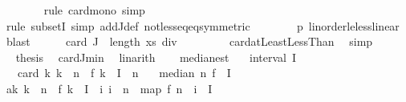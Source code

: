 \begin{isabellebody}
\ \ \ \ \ \ \isamarkupfalse%
\ {\isacharparenleft}{\kern0pt}rule\ card{\isacharunderscore}{\kern0pt}mono{\isacharcomma}{\kern0pt}\ simp{\isacharparenright}{\kern0pt}\isanewline
\ \ \ \ \ \ \isamarkupfalse%
\ {\isacharparenleft}{\kern0pt}rule\ subsetI{\isacharcomma}{\kern0pt}\ simp\ add{\isacharcolon}{\kern0pt}J{\isacharunderscore}{\kern0pt}def\ not{\isacharunderscore}{\kern0pt}less{\isacharunderscore}{\kern0pt}eq{\isacharunderscore}{\kern0pt}eq{\isacharbrackleft}{\kern0pt}symmetric{\isacharbrackright}{\kern0pt}{\isacharparenright}{\kern0pt}\isanewline
\ \ \ \ \ \ \isamarkupfalse%
\ p\ linorder{\isacharunderscore}{\kern0pt}le{\isacharunderscore}{\kern0pt}less{\isacharunderscore}{\kern0pt}linear\ \isamarkupfalse%
\ blast\isanewline
\ \ \ \ \isamarkupfalse%
\ {\isachardoublequoteopen}card\ J\ {\isasymle}\ {\isacharparenleft}{\kern0pt}length\ xs\ div\ {}{\isacharparenright}{\kern0pt}{\isachardoublequoteclose}\isanewline
\ \ \ \ \ \ \isamarkupfalse%
\ card{\isacharunderscore}{\kern0pt}atLeastLessThan\ \isamarkupfalse%
\ simp\isanewline
\ \ \ \ \isamarkupfalse%
\ \isamarkupfalse%
\ {\isacharquery}{\kern0pt}thesis\ \isamarkupfalse%
\ card{\isacharunderscore}{\kern0pt}J{\isacharunderscore}{\kern0pt}min\ \isamarkupfalse%
\ linarith\isanewline
\ \ \isamarkupfalse%
\isanewline
{}\isamarkupfalse%
%
\endisatagproof
{\isafoldproof}%
%
\isadelimproof
\isanewline
%
\endisadelimproof
\isanewline
{}\isamarkupfalse%
\ median{\isacharunderscore}{\kern0pt}est{\isacharcolon}{\kern0pt}\isanewline
\ \ \ {\isachardoublequoteopen}interval\ I{\isachardoublequoteclose}\isanewline
\ \ \ {\isachardoublequoteopen}{}{\isacharasterisk}{\kern0pt}card\ {\isacharbraceleft}{\kern0pt}k{\isachardot}{\kern0pt}\ k\ {\isacharless}{\kern0pt}\ n\ {\isasymand}\ f\ k\ {\isasymin}\ I{\isacharbraceright}{\kern0pt}\ {\isachargreater}{\kern0pt}\ n{\isachardoublequoteclose}\isanewline
\ \ \ {\isachardoublequoteopen}median\ n\ f\ {\isasymin}\ I{\isachardoublequoteclose}\isanewline
%
\isadelimproof
%
\endisadelimproof
%
\isatagproof
{}\isamarkupfalse%
\ {\isacharminus}{\kern0pt}\isanewline
\ \ \isamarkupfalse%
\ a{\isacharcolon}{\kern0pt}{\isachardoublequoteopen}{\isacharbraceleft}{\kern0pt}k{\isachardot}{\kern0pt}\ k\ {\isacharless}{\kern0pt}\ n\ {\isasymand}\ f\ k\ {\isasymin}\ I{\isacharbraceright}{\kern0pt}\ {\isacharequal}{\kern0pt}\ {\isacharbraceleft}{\kern0pt}i{\isachardot}{\kern0pt}\ i\ {\isacharless}{\kern0pt}\ n\ {\isasymand}\ map\ f\ {\isacharbrackleft}{\kern0pt}{}{\isachardot}{\kern0pt}{\isachardot}{\kern0pt}{\isacharless}{\kern0pt}n{\isacharbrackright}{\kern0pt}\ {\isacharbang}{\kern0pt}\ i\ {\isasymin}\ I{\isacharbraceright}{\kern0pt}{\isachardoublequoteclose}\isanewline

\end{isabellebody}
